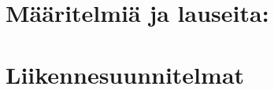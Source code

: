 \documentclass[12pt,oneside,a4paper]{amsbook} %
\begin{document}

\chapter{Määritelmiä ja lauseita:} %
 

\chapter{Liikennesuunnitelmat}



\end{document}
